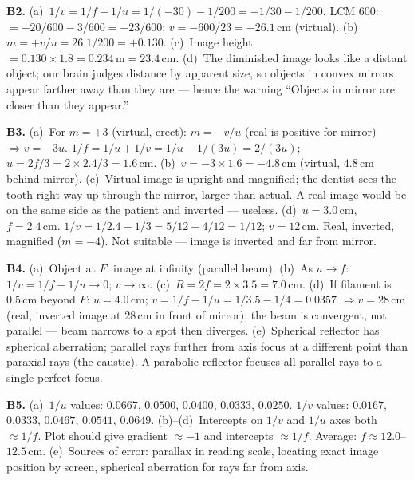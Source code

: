 \textbf{B2.}
(a)~$1/v=1/f-1/u=1/(-30)-1/200=-1/30-1/200$.
LCM 600: $=-20/600-3/600=-23/600$;
$v=-600/23=-26.1\,\text{cm}$ (virtual). \quad
(b)~$m=+v/u=26.1/200=+0.130$. \quad
(c)~Image height $=0.130\times1.8=0.234\,\text{m}
=23.4\,\text{cm}$. \quad
(d)~The diminished image looks like a distant object;
our brain judges distance by apparent size, so objects
in convex mirrors appear farther away than they are ---
hence the warning ``Objects in mirror are closer than
they appear.''

\textbf{B3.}
(a)~For $m=+3$ (virtual, erect): $m=-v/u$
(real-is-positive for mirror) $\Rightarrow v=-3u$.
$1/f=1/u+1/v=1/u-1/(3u)=2/(3u)$;
$u=2f/3=2\times2.4/3=1.6\,\text{cm}$. \quad
(b)~$v=-3\times1.6=-4.8\,\text{cm}$ (virtual,
$4.8\,\text{cm}$ behind mirror). \checkmark \quad
(c)~Virtual image is upright and magnified; the
dentist sees the tooth right way up through the mirror,
larger than actual. A real image would be on the same
side as the patient and inverted --- useless. \quad
(d)~$u=3.0\,\text{cm}$, $f=2.4\,\text{cm}$.
$1/v=1/2.4-1/3=5/12-4/12=1/12$; $v=12\,\text{cm}$.
Real, inverted, magnified ($m=-4$). Not suitable ---
image is inverted and far from mirror.

\textbf{B4.}
(a)~Object at $F$: image at infinity (parallel beam).
\quad
(b)~As $u\to f$: $1/v=1/f-1/u\to0$; $v\to\infty$. \quad
(c)~$R=2f=2\times3.5=7.0\,\text{cm}$. \quad
(d)~If filament is $0.5\,\text{cm}$ beyond $F$:
$u=4.0\,\text{cm}$; $v=1/f-1/u=1/3.5-1/4
=0.0357$ $\Rightarrow v=28\,\text{cm}$ (real, inverted
image at $28\,\text{cm}$ in front of mirror);
the beam is convergent, not parallel --- beam narrows
to a spot then diverges. \quad
(e)~Spherical reflector has spherical aberration;
parallel rays further from axis focus at a different
point than paraxial rays (the caustic). A parabolic
reflector focuses all parallel rays to a single perfect
focus.

\textbf{B5.}
(a)~$1/u$ values: $0.0667$, $0.0500$, $0.0400$,
$0.0333$, $0.0250$.
$1/v$ values: $0.0167$, $0.0333$, $0.0467$,
$0.0541$, $0.0649$. \quad
(b)--(d)~Intercepts on $1/v$ and $1/u$ axes both
$\approx1/f$. Plot should give gradient $\approx-1$
and intercepts $\approx1/f$.
Average: $f\approx12.0$--$12.5\,\text{cm}$. \quad
(e)~Sources of error: parallax in reading scale,
locating exact image position by screen, spherical
aberration for rays far from axis.

\endgroup

